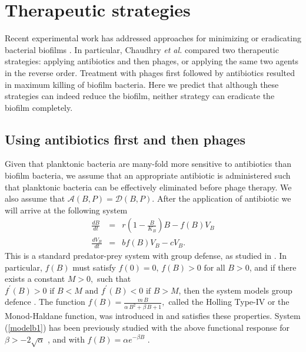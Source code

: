 
\section{Therapeutic strategies}
Recent experimental work has addressed approaches for minimizing or eradicating bacterial biofilms \citep{chaudhry_synergy_2017}.  In particular, Chaudhry {\it et al.} compared two therapeutic strategies: applying antibiotics and then phages, or applying the same two agents in the reverse order.  Treatment with phages first followed by antibiotics resulted in maximum killing of biofilm bacteria. Here we predict that although these strategies can indeed reduce the biofilm, neither strategy can eradicate the biofilm completely.

\subsection{Using antibiotics first and then phages}

Given that planktonic bacteria are many-fold more sensitive to antibiotics than biofilm bacteria, we assume that an appropriate antibiotic is administered such that planktonic bacteria can be effectively eliminated before phage therapy. We also assume that $\mathcal{A}(B,P)=\mathcal{D}(B, P).$ After the application of antibiotic we will arrive at the following system 
\begin{eqnarray}\label{modelb1}
\frac{dB}{dt} &=& r\left(1-\frac{B}{K_{B}}\right)B-f(B) V_{B} \nonumber\\
\frac{d V_{B}}{dt} &=& bf(B)V_{B}-cV_{B}.
\end{eqnarray}
This is a standard predator-prey system with group defense, as studied in  \citep{wolkowicz_bifurcation_1988, freedman_predator-prey_1986, zhu_bifurcation_2002,broer_predator-prey_2006}. In particular,   $f(B)$ must satisfy $f(0)=0, \, f(B)>0 \,\, \text{for all}\,\, B>0$, and if there exists a constant $M>0,$ such that 
$f^{'}(B)>0\,\, \text{if}\,\, B<M\, \, \text{and} \,\,f^{'}(B)<0 \,\, \text{if}\,\, B>M$, then the system models group defence \citep{freedman_predator-prey_1986}.
The  function $f(B)=\frac{m\,B}{\alpha \, B^{2}+ \beta \, B+1},$
called the Holling Type-IV or the Monod-Haldane function, was introduced in \citep{andrews_mathematical_1968} and satisfies these properties. System (\ref{modelb1}) has been previously studied with the above functional response for $\beta >-2\sqrt{\alpha}$  \citep{zhu_bifurcation_2002, jiang_multistable_2017}, and with $f(B) = \alpha e^{ -\beta B}$ \citep{xiao_global_2001}.\\

